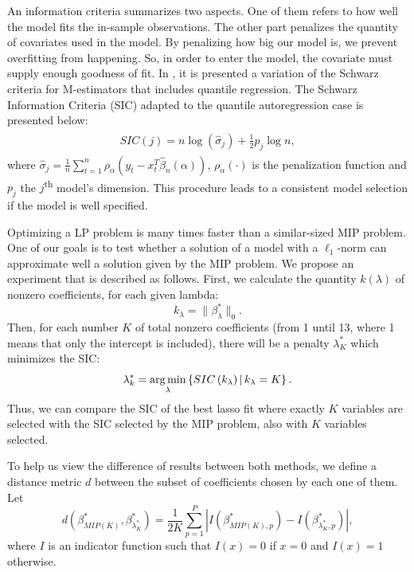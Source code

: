 An information criteria summarizes two aspects. One of them refers to how well the model fits the in-sample observations. The other part penalizes the quantity of covariates used in the model. By penalizing how big our model is, we prevent overfitting from happening. So, in order to enter the model, the covariate must supply enough goodness of fit.
In \cite{machado1993robust}, it is presented a variation of the Schwarz criteria for M-estimators that includes quantile regression. The Schwarz Information Criteria (SIC) adapted to the quantile autoregression case is presented below:
\begin{align} 
\begin{split}
SIC(j) = n \log(\hat{\sigma}_{j})+\frac{1}{2}p_{j}\log n,\label{eq:SIC}
\end{split}					
\end{align}
where $\hat{\sigma}_{j}= \frac{1}{n} \sum_{t=1}^{n} \rho_{\alpha}(y_{t}-x^{T}_{t}\hat{\beta}_{n}(\alpha))$, $\rho_\alpha(\cdot)$  is the penalization function and $p_{j}$ the $j$\textsuperscript{th} model's dimension. This procedure leads to a consistent model selection if the model is well specified. 



Optimizing a LP problem is many times faster than a similar-sized MIP problem. One of our goals is to test whether a solution of a model with a $\ell_1$-norm can approximate well a solution given by the MIP problem. We propose an experiment that is described as follows. First, we calculate the quantity $k(\lambda)$ of nonzero coefficients, for each given lambda:
\begin{equation}
k_\lambda = \| \beta^*_\lambda \|_0.
\end{equation}
Then, for each number $K$ of total nonzero coefficients (from 1 until 13, where 1 means that only the intercept is included), there will be a penalty $\lambda^*_K$ which minimizes the SIC:
\begin{equation}
\lambda^*_k = \operatorname*{arg\,min}_\lambda \left\lbrace  SIC\left( k_\lambda \right)  | \, k_\lambda = K \right\rbrace.
\end{equation}
Thus, we can compare the SIC of the best lasso fit where exactly $K$ variables are selected with the SIC selected by the MIP problem, also with $K$ variables selected.

To help us view the difference of results between both methods, we define a distance metric $d$ between the subset of coefficients chosen by each one of them. Let 
\begin{equation}
d(\beta^*_{MIP(K)}, \beta^*_{\lambda^*_K}) =  \frac{1}{2K} \sum_{p=1}^P { \left| I(\beta^*_{MIP(K),p}) - I( \beta^*_{\lambda^*_K,p}) \right| }, 
\label{eq:distance}
\end{equation}
where $I$ is an indicator function such that $I(x) = 0$ if $x = 0$ and $I(x)=1$ otherwise. 

